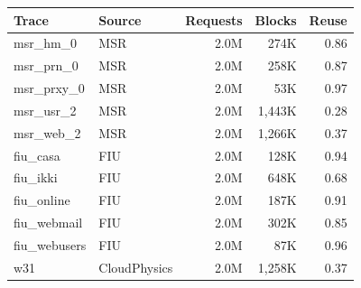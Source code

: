\begin{tabular}{llrrr}
\toprule
Trace & Source & Requests & Blocks & Reuse \\
\midrule
msr\_hm\_0 & MSR & 2.0M & 274K & 0.86 \\
msr\_prn\_0 & MSR & 2.0M & 258K & 0.87 \\
msr\_prxy\_0 & MSR & 2.0M & 53K & 0.97 \\
msr\_usr\_2 & MSR & 2.0M & 1,443K & 0.28 \\
msr\_web\_2 & MSR & 2.0M & 1,266K & 0.37 \\
fiu\_casa & FIU & 2.0M & 128K & 0.94 \\
fiu\_ikki & FIU & 2.0M & 648K & 0.68 \\
fiu\_online & FIU & 2.0M & 187K & 0.91 \\
fiu\_webmail & FIU & 2.0M & 302K & 0.85 \\
fiu\_webusers & FIU & 2.0M & 87K & 0.96 \\
w31 & CloudPhysics & 2.0M & 1,258K & 0.37 \\
\bottomrule
\end{tabular}
